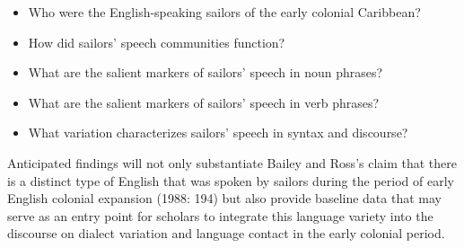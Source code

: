 \begin{itemize}
\item \begin{styleNormali}
Who were the English-speaking sailors of the early colonial Caribbean?
\end{styleNormali}
\item \begin{styleNormali}
How did sailors’ speech communities function?
\end{styleNormali}
\item \begin{styleNormali}
What are the salient markers of sailors’ speech in noun phrases?
\end{styleNormali}
\item \begin{styleNormali}
What are the salient markers of sailors’ speech in verb phrases?
\end{styleNormali}
\item \begin{styleNormali}
What variation characterizes sailors’ speech in syntax and discourse?
\end{styleNormali}
\end{itemize}
\begin{styleNormali}
Anticipated findings will not only substantiate Bailey and Ross’s claim that there is a distinct type of English that was spoken by sailors during the period of early English colonial expansion (1988: 194) but also provide baseline data that may serve as an entry point for scholars to integrate this language variety into the discourse on dialect variation and language contact in the early colonial period. 
\end{styleNormali}

